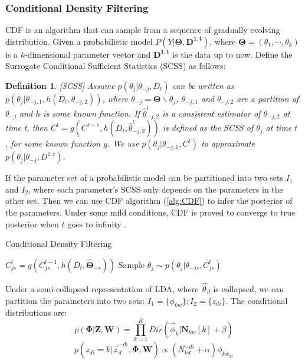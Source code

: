 \documentclass{article}
\newtheorem{mydef}{Definition}
\begin{document}
\subsubsection{Conditional Density Filtering}
CDF is an algorithm that can sample from a sequence of gradually evolving distribution. Given a probabilistic model $P(Y|\bm{\Theta}, \bm{D^{1:t}})$, where $\bm{\Theta}=(\theta_1,\cdots, \theta_k)$ is a $k$-dimensional parameter vector and $\bm{D^{1:t}}$ is the data up to now. Define the Surrogate Conditional Sufficient Statistics (SCSS) as follows:
\begin{mydef}
\label{def:SCSS}
[SCSS] Assume $p(\theta_j|\theta_{-j},D_t)$ can be written as $p(\theta_j|\theta_{-j,1},h(D_t, \theta_{-j,2}))$, where $\theta_{-j}=\bm{\Theta} \backslash \theta_j$, $\theta_{-j,1}$ and $\theta_{-j,2}$ are a partition of $\theta_{-j}$ and $h$ is some known function. If $\hat{\theta}_{-j,2}^t$ is a consistent estimator of $\theta_{-j,2}$ at time t, then $C^t=g(C^{t-1}, h(D_t, \hat{\theta}_{-j,2}^t))$ is defined as the SCSS of $\theta_j$ at time $t$ , for some known function $g$. We use $p(\theta_j|\theta_{-j,1}, C^t)$ to approximate $p(\theta_j|\theta_{-j},D^{1:t})$.
\end{mydef}

If the parameter set of a probabilistic model can be partitioned into two sets $I_1$ and $I_2$, where each parameter's SCSS only depends on the parameters in the other set. Then we can use CDF algorithm (\ref{alg:CDF}) to infer the posterior of the parameters. Under some mild conditions, CDF is proved to converge to true posterior when $t$ goes to infinity \cite{guhaniyogi2014bayesian}.

\begin{algorithm}[tb]
   \caption{Conditional Density Filtering}
   \label{alg:CDF}
\begin{algorithmic}
   				\STATE $C_{js}^t=g(C_{js}^{t-1}, h(D_t, \hat{\bm{\Theta}}_{-s}))$
   				\STATE Sample $\theta_j \sim p(\theta_j | \theta_{-js}, C_{js}^t)$
   			\ENDFOR
   		\ENDFOR
   \ENDFOR
\end{algorithmic}
\end{algorithm}

Under a semi-collapsed representation of LDA, where $\vec{\theta}_d$ is collapsed, we can partition the parameters into two sets: $I_1=\{\phi_{kw}\}; I_2=\{z_{di}\}$. The conditional distributions are: 
$$p(\bm{\Phi}|\bm{Z}, \bm{W})=\prod_{k=1}^K Dir(\vec{\phi}_k| \bm{N}_{kw}[k]+\beta)$$
$$p(z_{di}=k| \vec{z}_d^{-di}, \bm{\Phi}, \bm{W}) \propto (N_{kd}^{-di}+\alpha) {\phi}_{kw_{di}}$$ 
\end{document}
